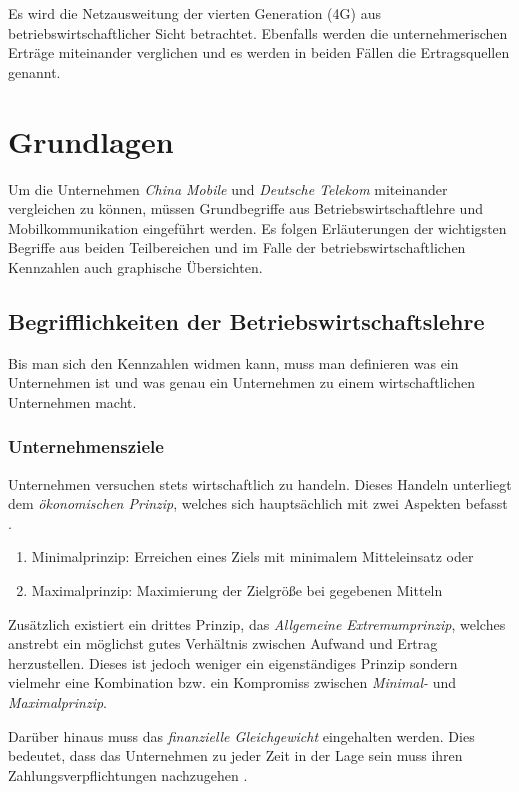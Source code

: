 Es wird die Netzausweitung der vierten Generation (4G) aus betriebswirtschaftlicher Sicht betrachtet. Ebenfalls werden die unternehmerischen Erträge miteinander verglichen und es werden in beiden Fällen die Ertragsquellen genannt.

\section{Grundlagen}
Um die Unternehmen \textit{China Mobile} und \textit{Deutsche Telekom} miteinander vergleichen zu können, müssen Grundbegriffe aus Betriebswirtschaftlehre und Mobilkommunikation eingeführt werden. Es folgen Erläuterungen der wichtigsten Begriffe aus beiden Teilbereichen und im Falle der betriebswirtschaftlichen Kennzahlen auch graphische Übersichten. 

\subsection{Begrifflichkeiten der Betriebswirtschaftslehre}
Bis man sich den Kennzahlen widmen kann, muss man definieren was ein Unternehmen ist und was genau ein Unternehmen zu einem wirtschaftlichen Unternehmen macht.

\subsubsection{Unternehmensziele}

Unternehmen versuchen stets wirtschaftlich zu handeln. Dieses Handeln unterliegt dem \textit{ökonomischen Prinzip}, welches sich hauptsächlich mit zwei Aspekten befasst \cite{muller}.

\begin{enumerate}
\item Minimalprinzip: Erreichen eines Ziels mit minimalem Mitteleinsatz oder
\item Maximalprinzip: Maximierung der Zielgröße bei gegebenen Mitteln
\end{enumerate}

Zusätzlich existiert ein drittes Prinzip, das \textit{Allgemeine Extremumprinzip}, welches anstrebt ein möglichst gutes Verhältnis zwischen Aufwand und Ertrag herzustellen. Dieses ist jedoch weniger ein eigenständiges Prinzip sondern vielmehr eine Kombination bzw. ein Kompromiss zwischen  \textit{Minimal-} und \textit{Maximalprinzip}. 

Darüber hinaus muss das \textit{finanzielle Gleichgewicht} eingehalten werden. Dies bedeutet, dass das Unternehmen zu jeder Zeit in der Lage sein muss ihren Zahlungsverpflichtungen nachzugehen \cite{muller}.

